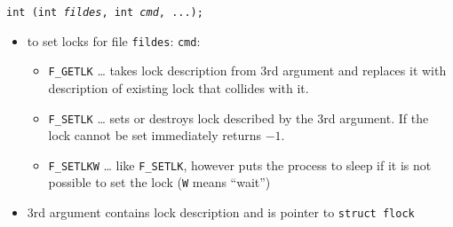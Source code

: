 

\begin{slide}
\texttt{int (int \emph{fildes}, int \emph{cmd}, ...);}
\begin{itemize}
\item to set locks for file \texttt{fildes}:
\texttt{cmd}: 
    \begin{itemize}
    \item \texttt{F\_GETLK} \dots{} takes lock description from 3rd argument
    and replaces it with description of existing lock that collides with it.
    \item \texttt{F\_SETLK} \dots{} sets or destroys lock described by the 3rd
    argument. If the lock cannot be set immediately returns $-1$.
    \item \texttt{F\_SETLKW} \dots{} like \texttt{F\_SETLK}, however puts
    the process to sleep if it is not possible to set the lock 
    (\texttt{W} means ``wait'')
    \end{itemize}
\item 3rd argument contains lock description and is pointer to 
\texttt{struct flock}
\end{itemize}
\end{slide}

